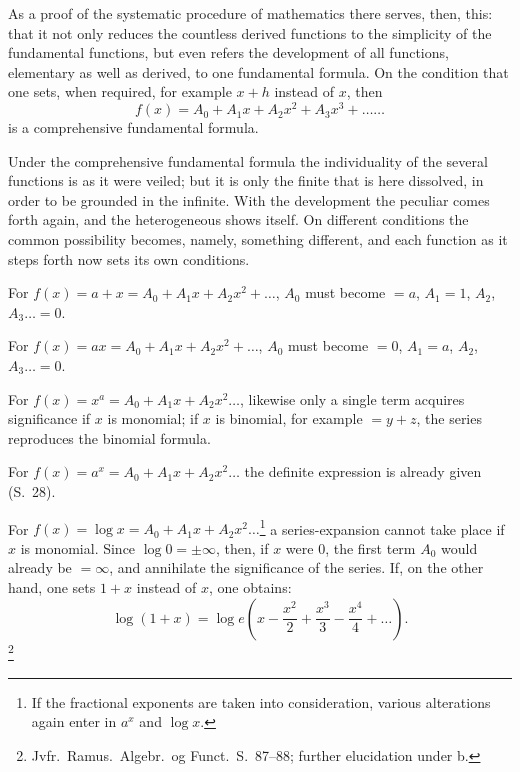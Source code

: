 \documentclass[12pt]{book}
\begin{document}
As a proof of the systematic procedure of mathematics there serves, then, this:
that it not only reduces the countless derived functions to the simplicity of the
fundamental functions, but even refers the development of all functions, elementary
as well as derived, to one fundamental formula. On the condition that one sets, when
required, for example $x+h$ instead of $x$, then
\[
f(x) = A_0 + A_1 x + A_2 x^{2} + A_3 x^{3} + \dots\dots
\]
is a comprehensive fundamental formula.

Under the comprehensive fundamental formula the individuality of the several
functions is as it were veiled; but it is only the finite that is here dissolved, in
order to be grounded in the infinite. With the development the peculiar comes forth
again, and the heterogeneous shows itself. On different conditions the common
possibility becomes, namely, something different, and each function as it steps
forth now sets its own conditions.

For $f(x) = a+x = A_0 + A_1 x + A_2 x^{2} + \dots$, $A_0$ must become $= a$,
$A_1 = 1$, $A_2$, $A_3 \dots = 0$.

For $f(x) = ax = A_0 + A_1 x + A_2 x^{2} + \dots$, $A_0$ must become $= 0$,
$A_1 = a$, $A_2$, $A_3 \dots = 0$.

For $f(x) = x^{a} = A_0 + A_1 x + A_2 x^{2}\dots$, likewise only a single term
acquires significance if $x$ is monomial; if $x$ is binomial, for example $= y+z$,
the series reproduces the binomial formula.

For $f(x) = a^{x} = A_0 + A_1 x + A_2 x^{2}\dots$ the definite expression is already
given (S.\ 28).

For $f(x) = \log x = A_0 + A_1 x + A_2 x^{2}\dots$\footnote{If the fractional
exponents are taken into consideration, various alterations again enter in $a^{x}$
and $\log x$.} a series-expansion cannot take place if $x$ is monomial. Since
$\log 0 = \pm\infty$, then, if $x$ were 0, the first term $A_0$ would already be
$= \infty$, and annihilate the significance of the series. If, on the other hand,
one sets $1+x$ instead of $x$, one obtains:
\[
\log(1+x) = \log e\left(x - \frac{x^{2}}{2} + \frac{x^{3}}{3} - \frac{x^{4}}{4}
+ \dots\right).
\]\footnote{Jvfr.\ Ramus.\ Algebr.\ og Funct.\ S.\ 87--88; further elucidation
under b.}
\end{document}
